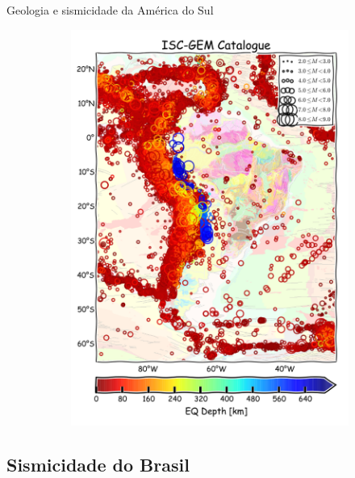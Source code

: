 \documentclass[ucs,8pt]{beamer}
\begin{document}
\begin{frame}{Geologia e sismicidade da América do Sul}
\begin{figure}[H]
\begin{subfigure}[t]{0.48\textwidth}
	  \includegraphics[width=.85\textwidth]{seismicity_sa} 
	  \label{fig:sa_seis} 
	\end{subfigure}
	\label{fig:eq_record}
\end{figure}
\end{frame}



\subsection{Sismicidade do Brasil}
\end{document}
